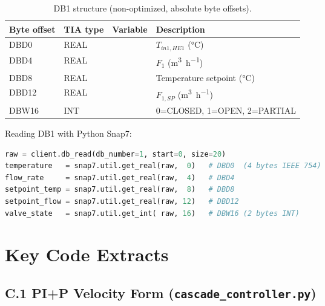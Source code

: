 \begin{table}[H]
  \centering
  \caption{DB1 structure (non-optimized, absolute byte offsets).}
  \label{tab:app_db1}
  \begin{tabular}{@{}C{2.4cm}C{2.4cm}L{3.5cm}L{5cm}@{}}
    \toprule
    \textbf{Byte offset} & \textbf{TIA type} & \textbf{Variable} & \textbf{Description} \\
    \midrule
    DBD0  & REAL &     & $T_{in1,HE1}$ (\si{\degreeCelsius}) \\
    DBD4  & REAL &      & $F_1$ (\si{\metre\cubed\per\hour}) \\
    DBD8  & REAL &  & Temperature setpoint (\si{\degreeCelsius}) \\
    DBD12 & REAL &  & $F_{1,SP}$ (\si{\metre\cubed\per\hour}) \\
    DBW16 & INT  &    & 0=CLOSED, 1=OPEN, 2=PARTIAL \\
    \bottomrule
  \end{tabular}
\end{table}

Reading DB1 with Python Snap7:
\begin{lstlisting}[language=Python, caption={Snap7 DB1 read (absolute byte offsets).}]
raw = client.db_read(db_number=1, start=0, size=20)
temperature   = snap7.util.get_real(raw,  0)   # DBD0  (4 bytes IEEE 754)
flow_rate     = snap7.util.get_real(raw,  4)   # DBD4
setpoint_temp = snap7.util.get_real(raw,  8)   # DBD8
setpoint_flow = snap7.util.get_real(raw, 12)   # DBD12
valve_state   = snap7.util.get_int( raw, 16)   # DBW16 (2 bytes INT)
\end{lstlisting}

\chapter{Key Code Extracts}
\label{app:code}

\section*{C.1 \quad PI+P Velocity Form (\texttt{cascade\_controller.py})}

